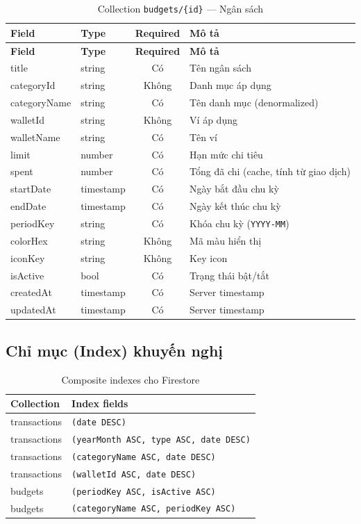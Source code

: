 \begin{longtable}{|l|l|c|p{6cm}|}
\caption{Collection \texttt{budgets/\{id\}} --- Ngân sách} \\
\hline
\textbf{Field} & \textbf{Type} & \textbf{Required} & \textbf{Mô tả} \\
\hline
\endfirsthead
\hline
\textbf{Field} & \textbf{Type} & \textbf{Required} & \textbf{Mô tả} \\
\hline
\endhead
title & string & Có & Tên ngân sách \\
\hline
categoryId & string & Không & Danh mục áp dụng \\
\hline
categoryName & string & Có & Tên danh mục (denormalized) \\
\hline
walletId & string & Không & Ví áp dụng \\
\hline
walletName & string & Có & Tên ví \\
\hline
limit & number & Có & Hạn mức chi tiêu \\
\hline
spent & number & Có & Tổng đã chi (cache, tính từ giao dịch) \\
\hline
startDate & timestamp & Có & Ngày bắt đầu chu kỳ \\
\hline
endDate & timestamp & Có & Ngày kết thúc chu kỳ \\
\hline
periodKey & string & Có & Khóa chu kỳ (\texttt{YYYY-MM}) \\
\hline
colorHex & string & Không & Mã màu hiển thị \\
\hline
iconKey & string & Không & Key icon \\
\hline
isActive & bool & Có & Trạng thái bật/tắt \\
\hline
createdAt & timestamp & Có & Server timestamp \\
\hline
updatedAt & timestamp & Có & Server timestamp \\
\hline
\end{longtable}

\subsection{Chỉ mục (Index) khuyến nghị}

\begin{table}[H]
\centering
\caption{Composite indexes cho Firestore}
\begin{tabularx}{\textwidth}{|l|X|}
\hline
\textbf{Collection} & \textbf{Index fields} \\
\hline
transactions & \texttt{(date DESC)} \\
\hline
transactions & \texttt{(yearMonth ASC, type ASC, date DESC)} \\
\hline
transactions & \texttt{(categoryName ASC, date DESC)} \\
\hline
transactions & \texttt{(walletId ASC, date DESC)} \\
\hline
budgets & \texttt{(periodKey ASC, isActive ASC)} \\
\hline
budgets & \texttt{(categoryName ASC, periodKey ASC)} \\
\hline
\end{tabularx}
\end{table}

